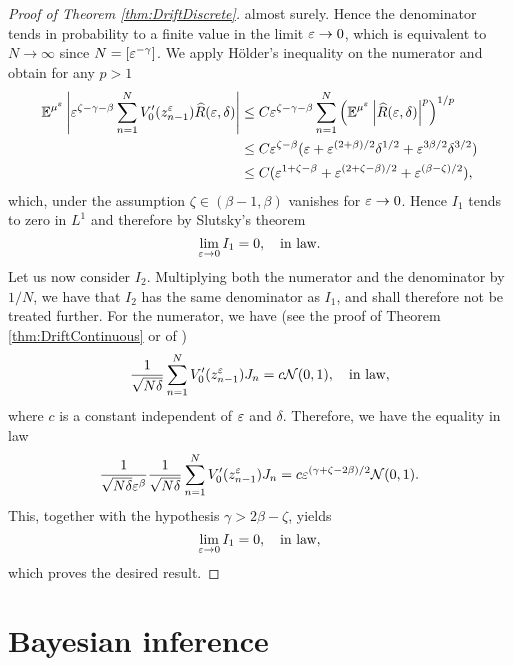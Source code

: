 \documentclass[10pt]{article}
\begin{document}
\begin{proof}[Proof of Theorem \ref{thm:DriftDiscrete}]
	almost surely. Hence the denominator tends in probability to a finite value in the limit $\varepsilon \to 0$, which is equivalent to $N \to \infty$ since $N = [\varepsilon^{-\gamma}]$. We apply Hölder's inequality on the numerator and obtain for any $p > 1$
	\begin{equation}
	\begin{aligned}
		\operatorname{\mathbb{E}}^{\mu^\varepsilon} \left\lvert\varepsilon^{\zeta-\gamma-\beta} \sum_{n=1}^{N}V_0'(z^\varepsilon_{n-1})\widehat R(\varepsilon, \delta)\right\rvert &\leq C \varepsilon^{\zeta-\gamma-\beta}\sum_{n=1}^{N} \left(\operatorname{\mathbb{E}}^{\mu^\varepsilon} \left\lvert\widehat R(\varepsilon, \delta)\right\rvert^p\right)^{1/p}\\
		&\leq C \varepsilon^{\zeta-\beta}(\varepsilon +  \varepsilon^{(2+\beta)/2}\delta^{1/2} + \varepsilon^{3\beta/2}\delta^{3/2})\\
		&\leq C (\varepsilon^{1+\zeta-\beta} +  \varepsilon^{(2+\zeta-\beta)/2} + \varepsilon^{(\beta-\zeta)/2}),
	\end{aligned}
	\end{equation}
	which, under the assumption $\zeta \in (\beta-1, \beta)$ vanishes for $\varepsilon \to 0$. Hence $I_1$ tends to zero in $L^1$ and therefore by Slutsky's theorem
	\begin{equation}
		\lim_{\varepsilon \to 0} I_1 = 0, \quad \text{in law}.
	\end{equation}
	Let us now consider $I_2$. Multiplying both the numerator and the denominator by $1/N$, we have that $I_2$ has the same denominator as $I_1$, and shall therefore not be treated further. For the numerator, we have (see the proof of Theorem \ref{thm:DriftContinuous} or of \cite[Theorem 3.5]{PaS07})
	\begin{equation}
		\frac{1}{\sqrt{N\delta}}\sum_{n=1}^{N}V_0'(z^\varepsilon_{n-1})J_n = c\mathcal N(0, 1), \quad \text{in law},
	\end{equation}
	where $c$ is a constant independent of $\varepsilon$ and $\delta$. Therefore, we have the equality in law
	\begin{equation}
		\frac{1}{\sqrt{N\delta} \varepsilon^\beta} \frac{1}{\sqrt{N\delta}}\sum_{n=1}^{N}V_0'(z^\varepsilon_{n-1})J_n = c\varepsilon^{(\gamma +\zeta - 2\beta)/2} \mathcal N(0, 1).
	\end{equation} 
	This, together with the hypothesis $\gamma > 2\beta - \zeta$, yields
	\begin{equation}
		\lim_{\varepsilon \to 0} I_1 = 0, \quad \text{in law},
	\end{equation}
	which proves the desired result.
\end{proof}

\section{Bayesian inference}
\end{document}
